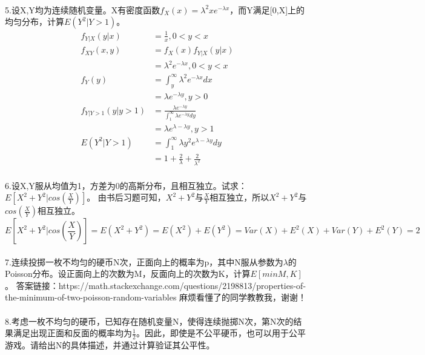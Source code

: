 \documentclass[UTF8]{ctexart}
\begin{document}
\paragraph{}
5.设X,Y均为连续随机变量。X有密度函数$f_X(x)={\lambda}^2xe^{-\lambda x}$，而Y满足[0,X]上的均匀分布，计算$E(Y^2\lvert Y>1)$。
\begin{equation*}
\begin{aligned}
f_{Y\lvert X}(y\lvert x)&=\frac{1}{x},0<y<x\\
f_{XY}(x,y)&=f_X(x)f_{Y\lvert X}(y\lvert x)\\
&={\lambda}^2e^{-\lambda x},0<y<x\\
f_{Y}(y)&=\int_y^\infty {\lambda}^2e^{-\lambda x}dx\\
&=\lambda e^{-\lambda y},y>0\\
f_{Y\lvert Y>1}(y\lvert y>1)&=\frac{\lambda e^{-\lambda y}}{\int_1^\infty {\lambda e^{-\lambda y}dy}}\\
&=\lambda e^{\lambda -\lambda y},y>1\\
E(Y^2\lvert Y>1)&=\int_1^\infty {\lambda y^2 e^{\lambda - \lambda y}dy}\\
&=1+\frac{2}{\lambda}+\frac{2}{\lambda ^2}
\end{aligned}
\end{equation*}
\paragraph{}
6.设X,Y服从均值为1，方差为0的高斯分布，且相互独立。试求：$E[X^2+Y^2\lvert cos(\frac{X}{Y})]$。
由书后习题可知，$X^2+Y^2$与$\frac{X}{Y}$相互独立，所以$X^2+Y^2$与$cos(\frac{X}{Y})$相互独立。
\begin{equation*}
E[X^2+Y^2\lvert cos(\frac{X}{Y})]=E(X^2 +Y^2)=E(X^2)+E(Y^2)=Var(X)+E^2(X)+Var(Y)+E^2(Y)=2
\end{equation*}
\paragraph{}
7.连续投掷一枚不均匀的硬币N次，正面向上的概率为p，其中N服从参数为$\lambda$的Poisson分布。设正面向上的次数为M，反面向上的次数为K，计算$E[min{M,K}]$。
答案链接：https://math.stackexchange.com/questions/2198813/properties-of-the-minimum-of-two-poisson-random-variables
麻烦看懂了的同学教教我，谢谢！
\paragraph{}
8.考虑一枚不均匀的硬币，已知存在随机变量N，使得连续抛掷N次，第N次的结果满足出现正面和反面的概率均为$\frac{1}{2}$。因此，即使是不公平硬币，也可以用于公平游戏。请给出N的具体描述，并通过计算验证其公平性。
\end{document}
